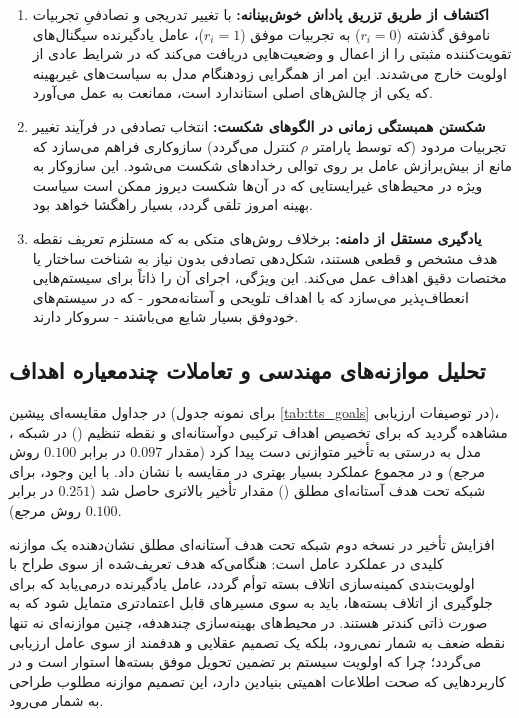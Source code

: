 \documentclass[oneside,openany,phd]{TMU-Thesis}
\begin{document}
\begin{enumerate}
  \item \textbf{اکتشاف از طریق تزریق پاداش خوش‌بینانه:} با تغییر تدریجی و تصادفیِ تجربیات ناموفق گذشته ($r_i=0$) به تجربیات موفق ($r_i=1$)، عامل یادگیرنده سیگنال‌های تقویت‌کننده مثبتی را از اعمال و وضعیت‌هایی دریافت می‌کند که در شرایط عادی از اولویت خارج می‌شدند. این امر از همگرایی زودهنگام مدل به سیاست‌های غیربهینه که یکی از چالش‌های اصلی  استاندارد است، ممانعت به عمل می‌آورد.
  \item \textbf{شکستن همبستگی زمانی در الگوهای شکست:} انتخاب تصادفی در فرآیند تغییر تجربیات مردود (که توسط پارامتر $\rho$ کنترل می‌گردد) سازوکاری فراهم می‌سازد که مانع از بیش‌برازش عامل بر روی توالی رخدادهای شکست می‌شود. این سازوکار به ویژه در محیط‌های غیرایستایی که در آن‌ها شکست دیروز ممکن است سیاست بهینه امروز تلقی گردد، بسیار راهگشا خواهد بود.
  \item \textbf{یادگیری مستقل از دامنه:} برخلاف روش‌های متکی به  که مستلزم تعریف نقطه هدف مشخص و قطعی هستند، شکل‌دهی تصادفی  بدون نیاز به شناخت ساختار یا مختصات دقیق اهداف عمل می‌کند. این ویژگی، اجرای آن را ذاتاً برای سیستم‌هایی انعطاف‌پذیر می‌سازد که با اهداف تلویحی و آستانه‌محور - که در سیستم‌های خودوفق بسیار شایع می‌باشند - سروکار دارند.
\end{enumerate}

\subsection{تحلیل موازنه‌های مهندسی و تعاملات چندمعیاره اهداف}

در جداول مقایسه‌ای پیشین (برای نمونه جدول \ref{tab:tts_goals} در توصیفات ارزیابی)، مشاهده گردید که برای تخصیص اهداف ترکیبی دوآستانه‌ای و نقطه تنظیم () در شبکه ، مدل  به درستی به تأخیر متوازنی دست پیدا کرد (مقدار $0.097$ در برابر $0.100$ روش مرجع) و در مجموع عملکرد بسیار بهتری در مقایسه با  نشان داد. با این وجود، برای شبکه  تحت هدف آستانه‌ای مطلق () مقدار تأخیر بالاتری حاصل شد ($0.251$ در برابر $0.100$ روش مرجع).

افزایش تأخیر در نسخه دوم شبکه تحت هدف آستانه‌ای مطلق  نشان‌دهنده یک موازنه کلیدی در عملکرد عامل است: هنگامی‌که هدف تعریف‌شده از سوی طراح با اولویت‌بندی کمینه‌سازی اتلاف بسته توأم گردد، عامل یادگیرنده درمی‌یابد که برای جلوگیری از اتلاف بسته‌ها، باید به سوی مسیرهای قابل اعتمادتری متمایل شود که به صورت ذاتی کندتر هستند. در محیط‌های بهینه‌سازی چندهدفه، چنین موازنه‌ای نه تنها نقطه ضعف به شمار نمی‌رود، بلکه یک تصمیم عقلایی و هدفمند از سوی عامل ارزیابی می‌گردد؛ چرا که اولویت سیستم بر تضمین تحویل موفق بسته‌ها استوار است و در کاربردهایی که صحت اطلاعات اهمیتی بنیادین دارد، این تصمیم موازنه مطلوب طراحی به شمار می‌رود.
\end{document}
